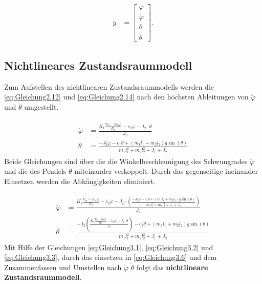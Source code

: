 \begin{align}
    \underline{y} &=
    \begin{bmatrix} \label{eq:Gleichung3.4}
        \varphi     \\
        \dot\varphi \\
        \theta      \\
        \dot\theta
    \end{bmatrix}.
\end{align}

\subsection{Nichtlineares Zustandsraummodell}\label{cap:nichtlinearesZustandsraummodell}

Zum Aufstellen des nichtlinearen Zustandsraummodells werden die \autoref{eq:Gleichung2.12} und \autoref{eq:Gleichung2.14} nach den höchsten Ableitungen von $\ddot\varphi$ und $\ddot\theta$ umgestellt.

\begin{align} \label{eq:Gleichung3.5}
    \begin{split}
        \ddot\varphi &= \frac{K_{\mathrm{t}} \frac{V_{\mathrm{m}} - K_{\mathrm{b}} \dot\varphi}{R_{\mathrm{a}}} - c_2 \dot\varphi - J_2 \cdot \ddot\theta}{J_2} \\
        \ddot\theta &= \frac{-J_2 \ddot\varphi - c_1 \dot\theta + \left( m_1 l_1 + m_2 l_2\right) g \sin(\theta)}{m_1 l_1^2 + m_2 l_2^2 + J_1 + J_2}
    \end{split}
\end{align}
\newline
Beide Gleichungen sind über die die Winkelbeschleunigung des Schwungrades $\ddot\varphi$ und die des Pendels $\ddot\theta$ miteinander verkoppelt. Durch das gegenseitige ineinander Einsetzen werden die Abhängigkeiten eliminiert.

\begin{align} \label{eq:Gleichung3.6}
    \begin{split}
        \ddot\varphi &= \frac{K_{\mathrm{t}} \frac{V_{\mathrm{m}} - K_{\mathrm{b}} \dot\varphi}{R_{\mathrm{a}}} - c_2 \dot\varphi - J_2 \cdot \left( \frac{-J_2 \ddot\varphi - c_1 \dot\theta + \left( m_1 l_1 + m_2 l_2\right) g \sin(\theta)}{m_1 l_1^2 + m_2 l_2^2 + J_1 + J_2}\right)}{J_2} \\
        \ddot\theta &= \frac{-J_2 \left( \frac{K_{\mathrm{t}} \frac{V_{\mathrm{m}} - K_{\mathrm{b}} \dot\varphi}{R_{\mathrm{a}}} - c_2 \dot\varphi - J_2 \cdot \ddot\theta}{J_2}\right) - c_1 \dot\theta + \left( m_1 l_1 + m_2 l_2\right) g \sin(\theta)}{m_1 l_1^2 + m_2 l_2^2 + J_1 + J_2}
    \end{split}
\end{align}
\newline
Mit Hilfe der Gleichungen \ref{eq:Gleichung3.1}, \ref{eq:Gleichung3.2} und \ref{eq:Gleichung3.3}, durch das einsetzen in \autoref{eq:Gleichung3.6} und dem Zusammenfassen und Umstellen nach $\ddot\varphi$ \bzw $\ddot\theta$ folgt das \textbf{nichtlineare Zustandsraummodell}.

